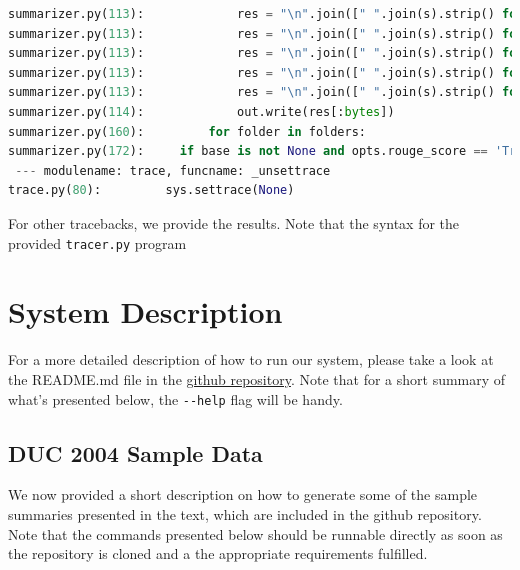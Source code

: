 \documentclass[10pt]{article}
\begin{document}
\begin{lstlisting}[breaklines,language=Python]
summarizer.py(113):             res = "\n".join([" ".join(s).strip() for s in summary])
summarizer.py(113):             res = "\n".join([" ".join(s).strip() for s in summary])
summarizer.py(113):             res = "\n".join([" ".join(s).strip() for s in summary])
summarizer.py(113):             res = "\n".join([" ".join(s).strip() for s in summary])
summarizer.py(113):             res = "\n".join([" ".join(s).strip() for s in summary])
summarizer.py(114):             out.write(res[:bytes])
summarizer.py(160):         for folder in folders:
summarizer.py(172):     if base is not None and opts.rouge_score == 'True':
 --- modulename: trace, funcname: _unsettrace
trace.py(80):         sys.settrace(None)
\end{lstlisting}

For other tracebacks, we provide the results. Note that the syntax for the provided \verb|tracer.py| program

\section{System Description}
For a more detailed description of how to run our system, please take a look at the README.md file in the \href{https://github.com/kandluis/document_summaries}{github repository}. Note that for a short summary of what's presented below, the \verb|--help| flag will be handy.

\subsection{DUC 2004 Sample Data}
\label{subsec:duc_sample_data}
We now provided a short description on how to generate some of the sample summaries presented in the text, which are included in the github repository. Note that the commands presented below should be runnable directly as soon as the repository is cloned and a the appropriate requirements fulfilled.
\end{document}
